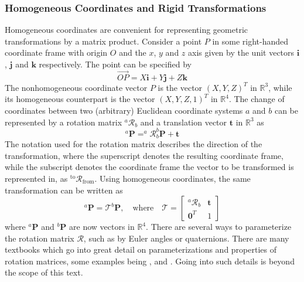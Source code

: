 \subsubsection{Homogeneous Coordinates and Rigid Transformations}
\label{section:transformations}
Homogeneous coordinates are convenient for representing geometric transformations by a matrix product.
Consider a point $P$ in some right-handed coordinate frame with origin $O$ and the $x$, $y$ and $z$ axis given by the unit vectors $\mathbf{i}$, $\mathbf{j}$ and $\mathbf{k}$ respectively. The point can be specified by
\begin{equation}
    \overrightarrow{OP}=X\mathbf{i}+Y\mathbf{j}+Z\mathbf{k}
\end{equation}
The nonhomogeneous coordinate vector $P$ is the vector $(X, Y, Z)^T$ in $\mathbb{R}^3$, while its homogeneous counterpart is the vector $(X,Y,Z,1)^T$ in $\mathbb{R}^4$. The change of coordinates between two (arbitrary) Euclidean coordinate systems $a$ and $b$ can be represented by a rotation matrix $^a\mathcal{R}_b$ and a translation vector $\mathbf{t}$ in $\mathbb{R}^3$ as
\begin{equation}
    ^a\mathbf{P}=^a\mathcal{R}_b^b\mathbf{P}+\mathbf{t}
\end{equation}
The notation used for the rotation matrix describes the direction of the transformation, where the superscript denotes the resulting coordinate frame, while the subscript denotes the coordinate frame the vector to be transformed is represented in, as $^{\text{to}}\mathcal{R}_{\text{from}}$.
Using homogeneous coordinates, the same transformation can be written as
\begin{equation}
\label{eq:homo_trans}
    ^a\mathbf{P}=\mathcal{T}^b\mathbf{P},\quad \text{where}\quad \mathcal{T}=\begin{bmatrix}^a\mathcal{R}_b & \mathbf{t} \\
    \mathbf{0}^T & 1 \end{bmatrix}
\end{equation}
where $^a\mathbf{P}$ and $^b\mathbf{P}$ are now vectors in $\mathbb{R}^4$. There are several ways to parameterize the rotation matrix $\mathcal{R}$, such as by Euler angles or quaternions. There are many textbooks which go into great detail on parameterizations and properties of rotation matrices, some examples being \cite{modsim}, \cite{kinematics} and \cite{geometry}. Going into such details is beyond the scope of this text.
